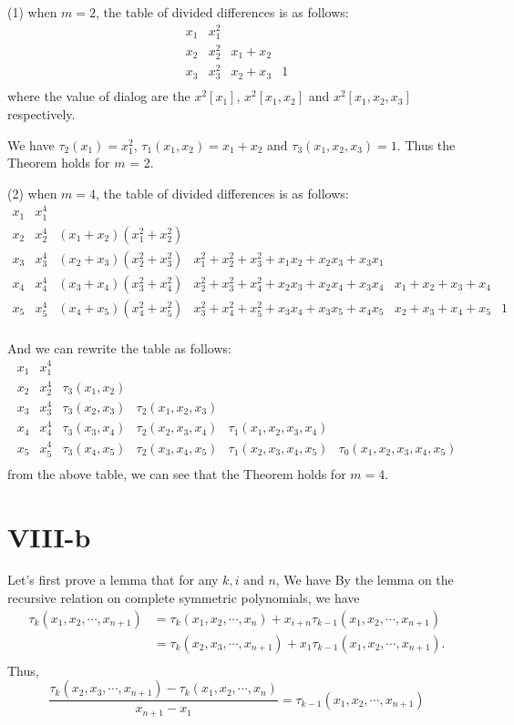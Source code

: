 \documentclass[a4paper]{article}
\begin{document}
(1) when $m =  2$, the table of divided differences is as follows:
\[\begin{array}{c|ccc}
  x_1 & x_1^2 &  \\
  x_2 & x_2^2 & x_1+x_2 &  \\
  x_3 & x_3^2 & x_2+x_3 &  1\\
\end{array}\]
where the value of dialog are the $x^2[x_1]$, $x^2[x_1,x_2]$ and $x^2[x_1,x_2,x_3]$ respectively.

We have $\tau_2(x_1) = x^2_1$, $\tau_1(x_1,x_2) = x_1 + x_2$ and $\tau_3(x_1,x_2,x_3) = 1$. Thus the Theorem holds for $m$ = 2. 

(2) when $m = 4$, the table of divided differences is as follows:
\[
\begin{array}{c|ccccc}
  x_1 & x_1^4 &  &  &  & \\
  x_2 & x_2^4 & (x_1 + x_2)(x_1^2 + x_2^2) &  &  & \\
  x_3 & x_3^4 & (x_2 + x_3)(x_2^2 + x_3^2) & x_1^2 + x_2^2 + x_3^2 + x_1 x_2 + x_2 x_3 + x_3 x_1 &  & \\
  x_4 & x_4^4 & (x_3 + x_4)(x_3^2 + x_4^2) & x_2^2 + x_3^2 + x_4^2 + x_2 x_3 + x_2 x_4 + x_3 x_4 & x_1 + x_2 + x_3 + x_4 & \\
  x_5 & x_5^4 & (x_4 + x_5)(x_4^2 + x_5^2) & x_3^2 + x_4^2 + x_5^2 + x_3 x_4 + x_3 x_5 + x_4 x_5 & x_2 + x_3 + x_4 + x_5 & 1 \\
\end{array}
\]

And we can rewrite the table as follows:
\[
\begin{array}{c|ccccc}
  x_1 & x_1^4 &  &  &  & \\
  x_2 & x_2^4 & \tau_3(x_1, x_2) &  &  & \\
  x_3 & x_3^4 & \tau_3(x_2, x_3) & \tau_2(x_1, x_2, x_3) &  & \\
  x_4 & x_4^4 & \tau_3(x_3, x_4) & \tau_2(x_2, x_3, x_4) & \tau_1(x_1, x_2, x_3, x_4) & \\
  x_5 & x_5^4 & \tau_3(x_4, x_5) & \tau_2(x_3, x_4, x_5) & \tau_1(x_2, x_3, x_4, x_5) & \tau_0(x_1, x_2, x_3, x_4, x_5) \\
\end{array}
\]
from the above table, we can see that the Theorem holds for $m = 4$.

\section*{VIII-b}
Let's first prove a lemma that for any $k,i \text{ and } n$, We have
By the lemma on the recursive relation on complete symmetric polynomials, we have 
\begin{align*}
  \tau_k(x_1, x_2, \cdots, x_{n+1}) &= \tau_k(x_1, x_2, \cdots, x_{n}) + x_{i+n}\tau_{k-1}(x_1, x_2, \cdots, x_{n+1})\\
  & = \tau_k(x_2, x_3, \cdots, x_{n+1}) + x_1\tau_{k-1}(x_1, x_2, \cdots, x_{n+1}).\\
\end{align*}
Thus, 
\[
\dfrac{ \tau_k(x_{2}, x_{3}, \cdots, x_{n+1})-\tau_k(x_1, x_2, \cdots, x_n) }{x_{n+1} - x_1} = \tau_{k-1}(x_1, x_{2}, \cdots, x_{n+1})
\]
\end{document}
